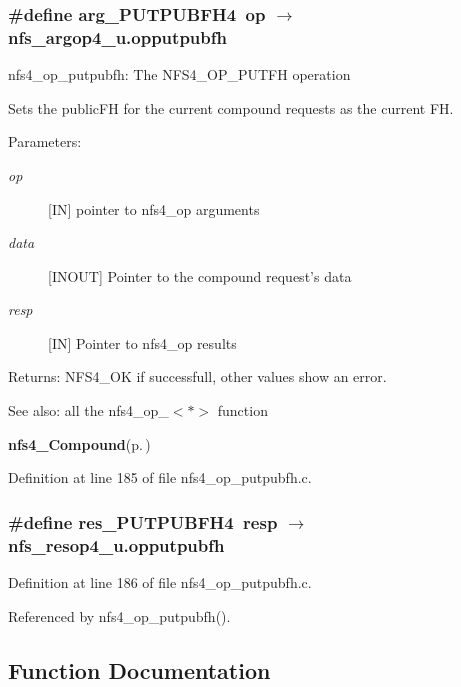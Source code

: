 \subsubsection{\setlength{\rightskip}{0pt plus 5cm}\#define arg\_\-PUTPUBFH4\ op $\rightarrow$ nfs\_\-argop4\_\-u.opputpubfh}\label{nfs4__op__putpubfh_8c_a0}


nfs4\_\-op\_\-putpubfh: The NFS4\_\-OP\_\-PUTFH operation

Sets the public\-FH for the current compound requests as the current FH.

\begin{Desc}
\item[Parameters:]
\begin{description}
\item[{\em op}][IN] pointer to nfs4\_\-op arguments \item[{\em data}][INOUT] Pointer to the compound request's data \item[{\em resp}][IN] Pointer to nfs4\_\-op results\end{description}
\end{Desc}
\begin{Desc}
\item[Returns:]NFS4\_\-OK if successfull, other values show an error.\end{Desc}
\begin{Desc}
\item[See also:]all the nfs4\_\-op\_\-$<$$\ast$$>$ function 

{\bf nfs4\_\-Compound}{\rm (p.\,\pageref{nfs4__Compound_8c_a4})} \end{Desc}


Definition at line 185 of file nfs4\_\-op\_\-putpubfh.c.
\subsubsection{\setlength{\rightskip}{0pt plus 5cm}\#define res\_\-PUTPUBFH4\ resp $\rightarrow$ nfs\_\-resop4\_\-u.opputpubfh}\label{nfs4__op__putpubfh_8c_a1}




Definition at line 186 of file nfs4\_\-op\_\-putpubfh.c.

Referenced by nfs4\_\-op\_\-putpubfh().

\subsection{Function Documentation}
